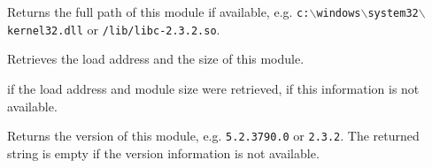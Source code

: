 Returns the full path of this module if available, e.g. 
\texttt{c:$\backslash$windows$\backslash$system32$\backslash$kernel32.dll} or 
\texttt{/lib/libc-2.3.2.so}.


\label{wxdynamiclibrarygetaddress}


Retrieves the load address and the size of this module.





\true if the load address and module size were retrieved, \false if this
information is not available.


\label{wxdynamiclibrarygetversion}


Returns the version of this module, e.g. \texttt{5.2.3790.0} or 
\texttt{2.3.2}. The returned string is empty if the version information is not
available.

